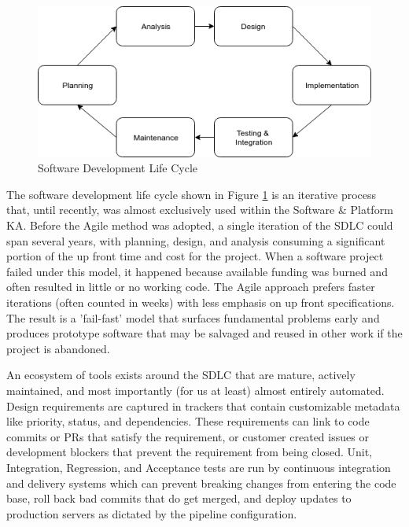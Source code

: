 

\begin{figure}[ht]
\centering
\includegraphics[width=.6\linewidth]{resource/img/ch_intro/sdlc.png}
\caption{Software Development Life Cycle}
\label{fig:intro:sdlc_redo}
\end{figure} 


The software development life cycle shown in Figure \ref{fig:intro:sdlc_redo} is an iterative process that, until recently, was almost exclusively used within the Software \& Platform KA. Before the Agile\cite{Beck_2013} method was adopted, a single iteration of the SDLC could span several years, with planning, design, and analysis consuming a significant portion of the up front time and cost for the project. When a software project failed under this model, it happened because available funding was burned and often resulted in little or no working code. The Agile approach prefers faster iterations (often counted in weeks) with less emphasis on up front specifications. The result is a 'fail-fast' model that surfaces fundamental problems early and produces prototype software that may be salvaged and reused in other work if the project is abandoned. 

An ecosystem of tools exists around the SDLC that are mature, actively maintained, and most importantly (for us at least) almost entirely automated. Design requirements are captured in trackers that contain customizable metadata like priority, status, and dependencies. These requirements can link to code commits or PRs that satisfy the requirement, or customer created issues or development blockers that prevent the requirement from being closed. Unit, Integration, Regression, and Acceptance tests are run by continuous integration and delivery systems which can prevent breaking changes from entering the code base, roll back bad commits that do get merged, and deploy updates to production servers as dictated by the pipeline configuration. 


